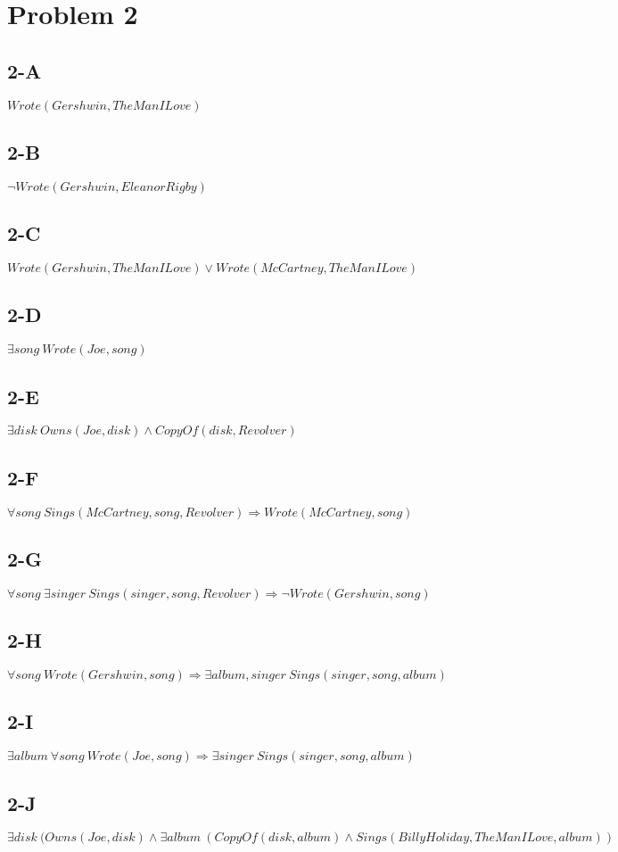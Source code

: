 \documentclass{article}
\begin{document}
    \section{Problem 2}
        \subsection{2-A}
            $Wrote(Gershwin, The Man I Love)$
        \subsection{2-B}
            $\lnot Wrote(Gershwin, Eleanor Rigby)$
        \subsection{2-C}
            $Wrote(Gershwin, The Man I Love)\lor Wrote(McCartney, The Man I Love)$
        \subsection{2-D}
            $\exists song\: Wrote(Joe, song)$
        \subsection{2-E}
            $\exists disk\: Owns(Joe, disk)\land CopyOf(disk, Revolver)$
        \subsection{2-F}
            $\forall song\: Sings(McCartney, song, Revolver) \Rightarrow Wrote(McCartney, song)$
        \subsection{2-G}
            $\forall song\: \exists singer\: Sings(singer, song, Revolver) \Rightarrow \lnot Wrote(Gershwin, song)$
        \subsection{2-H}
            $\forall song\: Wrote(Gershwin, song) \Rightarrow \exists album, singer\: Sings(singer, song, album)$
        \subsection{2-I}
            $\exists album\: \forall song\: Wrote(Joe, song) \Rightarrow \exists singer\: Sings(singer, song, album)$
        \subsection{2-J}
            $\exists disk\: (Owns(Joe, disk)\land\exists album\: (CopyOf(disk, album)\land Sings(Billy Holiday, The Man I Love, album))$
\end{document}
